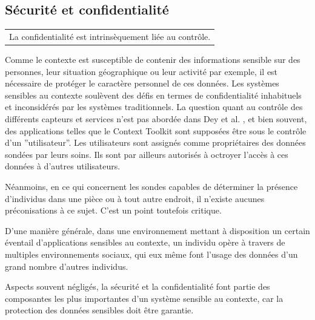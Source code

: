 \subsection{Sécurité et confidentialité}

{%
    \centering
    \begin{tabular}{l}
        La confidentialité est intrinsèquement liée au contrôle.
        \cite{ackerman_privacy_2001} \\
    \end{tabular}
\par}%


Comme le contexte est susceptible de contenir des informations sensible sur des
personnes, leur situation géographique ou leur activité par exemple, il est
nécessaire de protéger le caractère personnel de ces données. Les systèmes
sensibles au contexte soulèvent des défis en termes de confidentialité
inhabituels et inconsidérés par les systèmes traditionnels. La question quant au
contrôle des différents capteurs et services n'est pas abordée dans Dey et al.
\cite{dey_conceptual_2001}, et bien souvent, des applications telles que le
Context Toolkit sont supposées être sous le contrôle d'un ''utilisateur''. Les
utilisateurs sont assignés comme propriétaires des données sondées par leurs
soins. Ils sont par ailleurs autorisés à octroyer l'accès à ces données à
d'autres utilisateurs.

Néanmoins, en ce qui concernent les sondes capables de déterminer la présence
d'individus dans une pièce ou à tout autre endroit, il n'existe aucunes
préconisations à ce sujet. C'est un point toutefois critique.

D'une manière générale, dans une environnement mettant à disposition un certain
éventail d'applications sensibles au contexte, un individu opère à travers de
multiples environnements sociaux, qui eux même font l'usage des données d'un
grand nombre d'autres individus.

Aspects souvent négligés, la sécurité et la confidentialité font partie des
composantes les plus importantes d'un système sensible au contexte, car la
protection des données sensibles doit être garantie.

